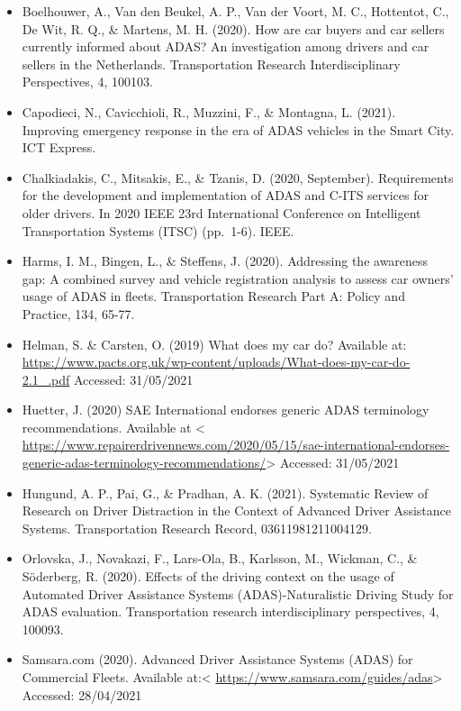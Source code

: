 \documentclass[
]{book}
\providecommand{\tightlist}{%
  \setlength{\itemsep}{0pt}\setlength{\parskip}{0pt}}
\begin{document}
\begin{itemize}
\tightlist
\item
  Boelhouwer, A., Van den Beukel, A. P., Van der Voort, M. C., Hottentot, C., De Wit, R. Q., \& Martens, M. H. (2020). How are car buyers and car sellers currently informed about ADAS? An investigation among drivers and car sellers in the Netherlands. Transportation Research Interdisciplinary Perspectives, 4, 100103.
\item
  Capodieci, N., Cavicchioli, R., Muzzini, F., \& Montagna, L. (2021). Improving emergency response in the era of ADAS vehicles in the Smart City. ICT Express.
\item
  Chalkiadakis, C., Mitsakis, E., \& Tzanis, D. (2020, September). Requirements for the development and implementation of ADAS and C-ITS services for older drivers. In 2020 IEEE 23rd International Conference on Intelligent Transportation Systems (ITSC) (pp.~1-6). IEEE.
\item
  Harms, I. M., Bingen, L., \& Steffens, J. (2020). Addressing the awareness gap: A combined survey and vehicle registration analysis to assess car owners' usage of ADAS in fleets. Transportation Research Part A: Policy and Practice, 134, 65-77.
\item
  Helman, S. \& Carsten, O. (2019) What does my car do? Available at: \url{https://www.pacts.org.uk/wp-content/uploads/What-does-my-car-do-2.1_.pdf} Accessed: 31/05/2021
\item
  Huetter, J. (2020) SAE International endorses generic ADAS terminology recommendations. Available at \textless{} \url{https://www.repairerdrivennews.com/2020/05/15/sae-international-endorses-generic-adas-terminology-recommendations/}\textgreater{} Accessed: 31/05/2021
\item
  Hungund, A. P., Pai, G., \& Pradhan, A. K. (2021). Systematic Review of Research on Driver Distraction in the Context of Advanced Driver Assistance Systems. Transportation Research Record, 03611981211004129.
\item
  Orlovska, J., Novakazi, F., Lars-Ola, B., Karlsson, M., Wickman, C., \& Söderberg, R. (2020). Effects of the driving context on the usage of Automated Driver Assistance Systems (ADAS)-Naturalistic Driving Study for ADAS evaluation. Transportation research interdisciplinary perspectives, 4, 100093.
\item
  Samsara.com (2020). Advanced Driver Assistance Systems (ADAS) for Commercial Fleets. Available at:\textless{} \url{https://www.samsara.com/guides/adas}\textgreater{} Accessed: 28/04/2021

\end{itemize}
\end{document}
